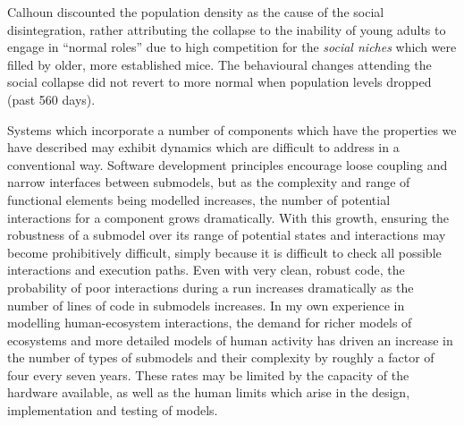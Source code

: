 Calhoun discounted the population density as the cause of the social
disintegration, rather attributing the collapse to the inability of
young adults to engage in ``normal roles'' due to high competition for
the \emph{social niches} which were filled by older, more established
mice. The behavioural changes attending the social collapse did not revert
to more normal when population levels dropped (past 560 days).

Systems which incorporate a number of components which have the
properties we have described may exhibit dynamics which are difficult
to address in a conventional way. Software development principles
encourage loose coupling and narrow interfaces between submodels, but
as the complexity and range of functional elements being modelled
increases, the number of potential interactions for a component grows
dramatically.  With this growth, ensuring the robustness of a submodel
over its range of potential states and interactions may become
prohibitively difficult, simply because it is difficult to check all
possible interactions and execution paths.  Even with very clean,
robust code, the probability of poor interactions during a run
increases dramatically as the number of lines of code in submodels
increases. In my own experience in modelling human-ecosystem
interactions, the demand for richer models of ecosystems and more
detailed models of human activity has driven an increase in the number
of types of submodels and their complexity by roughly a factor of four
every seven years. These rates may be limited by the
capacity of the hardware available, as well as the human limits which
arise in the design, implementation and testing of models.

